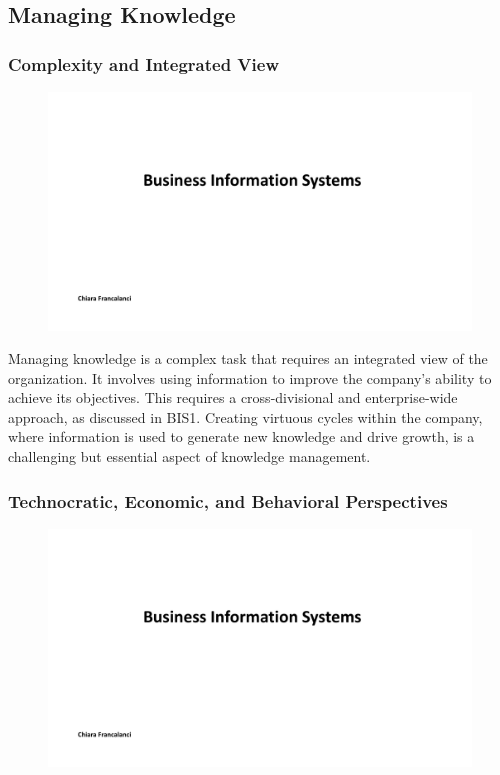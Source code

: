 \subsection{Managing Knowledge}\label{managing-knowledge}

\subsubsection{Complexity and Integrated
    View}\label{complexity-and-integrated-view}

\begin{figure}[!h]
    \centering
    \includegraphics[page=8, trim = 1.5cm 5cm 1.5cm 4.5cm, clip, width=\textwidth]{images/05 - KM.pdf}
\end{figure}

Managing knowledge is a complex task that requires an integrated view of
the organization. It involves using information to improve the company's
ability to achieve its objectives. This requires a cross-divisional and
enterprise-wide approach, as discussed in BIS1. Creating virtuous cycles
within the company, where information is used to generate new knowledge
and drive growth, is a challenging but essential aspect of knowledge
management.

\subsubsection{Technocratic, Economic, and Behavioral
    Perspectives}\label{technocratic-economic-and-behavioral-perspectives}


\begin{figure}[!h]
    \centering
    \includegraphics[page=9, trim = 1.5cm 4.5cm 1.5cm 3.5cm, clip, width=\textwidth]{images/05 - KM.pdf}
\end{figure}

